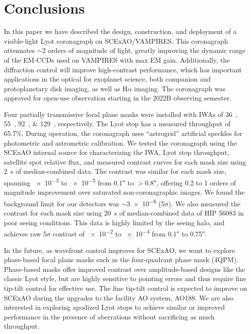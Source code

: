\documentclass[]{spie}  %
\begin{document}
\section{Conclusions}\label{sec:conclusions}

In this paper we have described the design, construction, and deployment of a visible-light Lyot coronagraph on SCExAO/VAMPIRES. This coronagraph attenuates $\sim$2 orders of magnitude of light, greatly improving the dynamic range of the EM-CCDs used on VAMPIRES with max EM gain. Additionally, the diffraction control will improve high-contrast performance, which has important applications in the optical for exoplanet science, both companion and protoplanetary disk imaging, as well as H$\alpha$ imaging. The coronagraph was approved for open-use observation starting in the 2022B observing semester.

Four partially transmissive focal plane masks were installed with IWAs of \qtylist{36;55;92;129}{\milliarcsecond}, respectively. The Lyot stop has a measured throughput of 65.7\%. During operation, the coronagraph uses ``astrogrid'' artificial speckles for photometric and astrometric calibration. We tested the coronagraph using the SCExAO internal source for characterizing the IWA, Lyot stop throughput, satellite spot relative flux, and measured contrast curves for each mask size using \qty{2}{\second} of median-combined data. The contrast was similar for each mask size, spanning \num{e-3} to \num{e-5} from \ang{;;0.1} to $>$\ang{;;0.8}, offering 0.2 to 1 orders of magnitude improvement over saturated non-coronagraphic images. We found the background limit for our detectors was $\sim$\num{3e-6} (5$\sigma$). We also measured the contrast for each mask size using \qty{20}{\second} of median-combined data of HIP 56083 in poor seeing conditions. This data is highly limited by the seeing halo, and achieves raw 5$\sigma$ contrast of \num{e-2} to \num{e-4} from \ang{;;0.1} to \ang{;;0.75}.

In the future, as wavefront control improves for SCExAO, we want to explore phase-based focal plane masks such as the four-quadrant phase mask (4QPM)\cite{rouanFourQuadrantPhase2007}. Phase-based masks offer improved contrast over amplitude-based designs like the classic Lyot style, but are highly sensitive to pointing errors and thus require fine tip-tilt control for effective use\cite{huby2017}. The fine tip-tilt control is expected to improve on SCExAO during the upgrades to the facility AO system, AO188\cite{minowa2010}. We are also interested in exploring apodized Lyot stops to achieve similar or improved performance in the presence of aberrations without sacrificing as much throughput.
\end{document}
